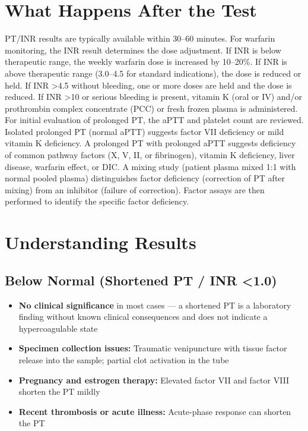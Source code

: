 \section*{What Happens After the Test}
PT/INR results are typically available within 30--60 minutes. For warfarin monitoring, the INR result determines the dose adjustment. If INR is below therapeutic range, the weekly warfarin dose is increased by 10--20\%. If INR is above therapeutic range (3.0--4.5 for standard indications), the dose is reduced or held. If INR >4.5 without bleeding, one or more doses are held and the dose is reduced. If INR >10 or serious bleeding is present, vitamin K (oral or IV) and/or prothrombin complex concentrate (PCC) or fresh frozen plasma is administered. For initial evaluation of prolonged PT, the aPTT and platelet count are reviewed. Isolated prolonged PT (normal aPTT) suggests factor VII deficiency or mild vitamin K deficiency. A prolonged PT with prolonged aPTT suggests deficiency of common pathway factors (X, V, II, or fibrinogen), vitamin K deficiency, liver disease, warfarin effect, or DIC. A mixing study (patient plasma mixed 1:1 with normal pooled plasma) distinguishes factor deficiency (correction of PT after mixing) from an inhibitor (failure of correction). Factor assays are then performed to identify the specific factor deficiency.

\section*{Understanding Results}

\subsection*{Below Normal (Shortened PT / INR <1.0)}
\begin{itemize}
  \item \textbf{No clinical significance} in most cases --- a shortened PT is a laboratory finding without known clinical consequences and does not indicate a hypercoagulable state
  \item \textbf{Specimen collection issues:} Traumatic venipuncture with tissue factor release into the sample; partial clot activation in the tube
  \item \textbf{Pregnancy and estrogen therapy:} Elevated factor VII and factor VIII shorten the PT mildly
  \item \textbf{Recent thrombosis or acute illness:} Acute-phase response can shorten the PT
\end{itemize}

